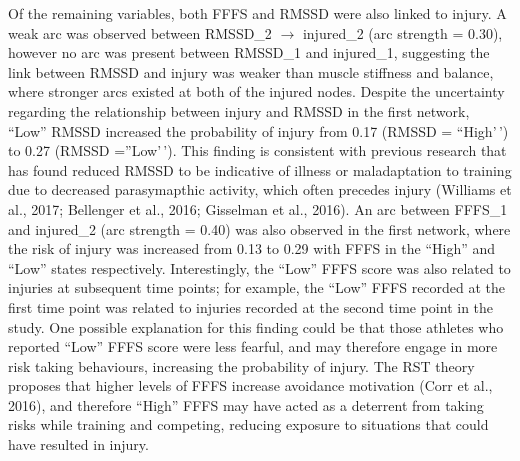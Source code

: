 \documentclass[
]{frontiersHLTH}
\begin{document}
Of the remaining variables, both FFFS and RMSSD were also linked to
injury. A weak arc was observed between RMSSD\_2 \(\rightarrow\)
injured\_2 (arc strength = 0.30), however no arc was present between
RMSSD\_1 and injured\_1, suggesting the link between RMSSD and injury
was weaker than muscle stiffness and balance, where stronger arcs
existed at both of the injured nodes. Despite the uncertainty regarding
the relationship between injury and RMSSD in the first network, ``Low''
RMSSD increased the probability of injury from 0.17 (RMSSD = ``High'\,')
to 0.27 (RMSSD =''Low'\,'). This finding is consistent with previous
research that has found reduced RMSSD to be indicative of illness or
maladaptation to training due to decreased parasymapthic activity, which
often precedes injury (Williams et al., 2017; Bellenger et al., 2016;
Gisselman et al., 2016). An arc between FFFS\_1 and injured\_2 (arc
strength = 0.40) was also observed in the first network, where the risk
of injury was increased from 0.13 to 0.29 with FFFS in the ``High'' and
``Low'' states respectively. Interestingly, the ``Low'' FFFS score was
also related to injuries at subsequent time points; for example, the
``Low'' FFFS recorded at the first time point was related to injuries
recorded at the second time point in the study. One possible explanation
for this finding could be that those athletes who reported ``Low'' FFFS
score were less fearful, and may therefore engage in more risk taking
behaviours, increasing the probability of injury. The RST theory
proposes that higher levels of FFFS increase avoidance motivation (Corr
et al., 2016), and therefore ``High'' FFFS may have acted as a deterrent
from taking risks while training and competing, reducing exposure to
situations that could have resulted in injury.
\end{document}
